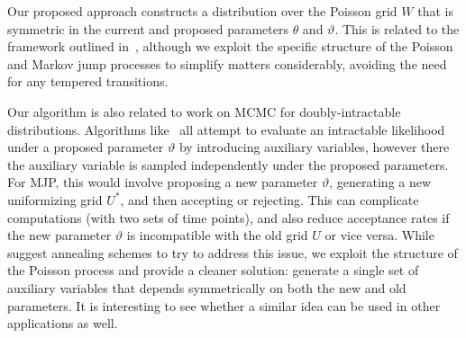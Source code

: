 Our proposed approach constructs a distribution over the Poisson grid $W$ that is symmetric in the current and proposed parameters $\theta$ and $\vartheta$. This is related to the framework outlined in~\citet{Neal04Drag}, although we exploit the specific structure of the Poisson and Markov jump processes to simplify matters considerably, avoiding the need for any tempered transitions. 

Our algorithm is also related to work on MCMC for doubly-intractable distributions.  Algorithms like~\cite{Moller2006,murray2006,Andrieu09} all attempt to evaluate an intractable likelihood under a proposed parameter $\vartheta$ by introducing auxiliary variables, however there the auxiliary variable is sampled independently under the proposed parameters. 
For MJP, this would involve proposing a new parameter $\vartheta$, generating a new uniformizing grid $U^*$, and then accepting or rejecting. 
This can complicate computations (with two sets of time points), and also
reduce acceptance rates if the new parameter $\vartheta$ is incompatible with the old grid $U$ or vice versa. 
While~\cite{murray2006} suggest annealing schemes to try to address this issue, we exploit the structure of the Poisson process and provide a cleaner solution: generate a single set of auxiliary variables that depends symmetrically on both the new and old parameters. 
It is interesting to see whether a similar idea can be used in other applications as well.
